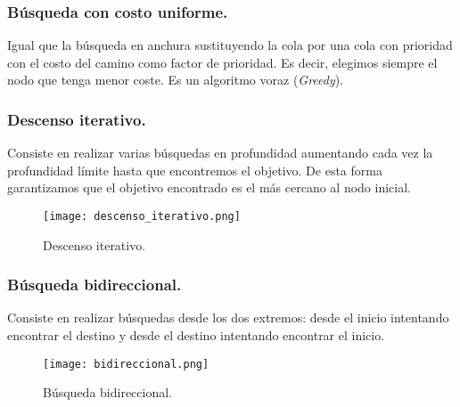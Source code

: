 \documentclass[12pt,spanish]{article}
\numberwithin{definition}{subsection}
\begin{document}
\subsubsection{Búsqueda con costo uniforme.}

Igual que la búsqueda en anchura sustituyendo la cola por una cola con prioridad con el costo del camino como factor de prioridad. Es decir, elegimos siempre el nodo que tenga menor coste. Es un algoritmo voraz (\textit{Greedy}).


\subsubsection{Descenso iterativo.}

Consiste en realizar varias búsquedas en profundidad aumentando cada vez la profundidad límite hasta que encontremos el objetivo. De esta forma garantizamos que el objetivo encontrado es el más cercano al nodo inicial.

\begin{figure}[H]
\centering
\texttt{[image: descenso\_iterativo.png]}
\caption{Descenso iterativo.}
\end{figure}

\subsubsection{Búsqueda bidireccional.}

Consiste en realizar búsquedas desde los dos extremos: desde el inicio intentando encontrar el destino y desde el destino intentando encontrar el inicio.

\begin{figure}[H]
\centering
\texttt{[image: bidireccional.png]}
\caption{Búsqueda bidireccional.}
\end{figure}
\end{document}
